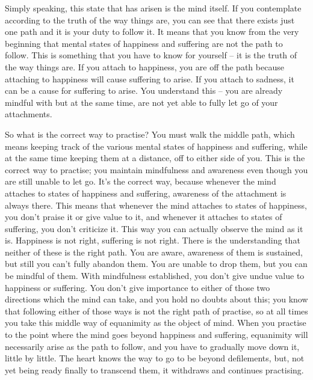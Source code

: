 Simply speaking, this state that has arisen is the mind itself. If you contemplate according to the truth of the way things are, you can see that there exists just one path and it is your duty to follow it. It means that you know from the very beginning that mental states of happiness and suffering are not the path to follow. This is something that you have to know for yourself -- it is the truth of the way things are. If you attach to happiness, you are off the path because attaching to happiness will cause suffering to arise. If you attach to sadness, it can be a cause for suffering to arise. You understand this -- you are already mindful with  but at the same time, are not yet able to fully let go of your attachments.

So what is the correct way to practise? You must walk the middle path, which means keeping track of the various mental states of happiness and suffering, while at the same time keeping them at a distance, off to either side of you. This is the correct way to practise; you maintain mindfulness and awareness even though you are still unable to let go. It's the correct way, because whenever the mind attaches to states of happiness and suffering, awareness of the attachment is always there. This means that whenever the mind attaches to states of happiness, you don't praise it or give value to it, and whenever it attaches to states of suffering, you don't criticize it. This way you can actually observe the mind as it is. Happiness is not right, suffering is not right. There is the understanding that neither of these is the right path. You are aware, awareness of them is sustained, but still you can't fully abandon them. You are unable to drop them, but you can be mindful of them. With mindfulness established, you don't give undue value to happiness or suffering. You don't give importance to either of those two directions which the mind can take, and you hold no doubts about this; you know that following either of those ways is not the right path of practise, so at all times you take this middle way of equanimity as the object of mind. When you practise to the point where the mind goes beyond happiness and suffering, equanimity will necessarily arise as the path to follow, and you have to gradually move down it, little by little. The heart knows the way to go to be beyond defilements, but, not yet being ready finally to transcend them, it withdraws and continues practising.

